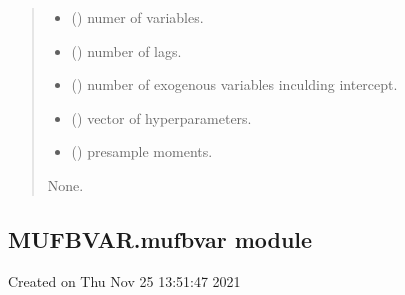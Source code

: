 \documentclass[letterpaper,10pt,english]{sphinxmanual}
\begin{document}
\begin{fulllineitems}
\label{\detokenize{MUFBVAR:MUFBVAR.mfbvar_funcs.varprior}}
\pysigstartsignatures
{}
\pysigstopsignatures\begin{quote}\begin{description}
\begin{itemize}
\item {} 
\sphinxAtStartPar
{} () \textendash{} numer of variables.

\item {} 
\sphinxAtStartPar
{} () \textendash{} number of lags.

\item {} 
\sphinxAtStartPar
{} () \textendash{} number of exogenous variables inculding intercept.

\item {} 
\sphinxAtStartPar
{} () \textendash{} vector of hyperparameters.

\item {} 
\sphinxAtStartPar
{} () \textendash{} pre\sphinxhyphen{}sample moments.

\end{itemize}

\sphinxAtStartPar
None.

\end{description}\end{quote}

\end{fulllineitems}



\subsection{MUFBVAR.mufbvar module}
\label{\detokenize{MUFBVAR:module-MUFBVAR.mufbvar}}\label{\detokenize{MUFBVAR:mufbvar-mufbvar-module}}
\sphinxAtStartPar
Created on Thu Nov 25 13:51:47 2021
\end{document}

